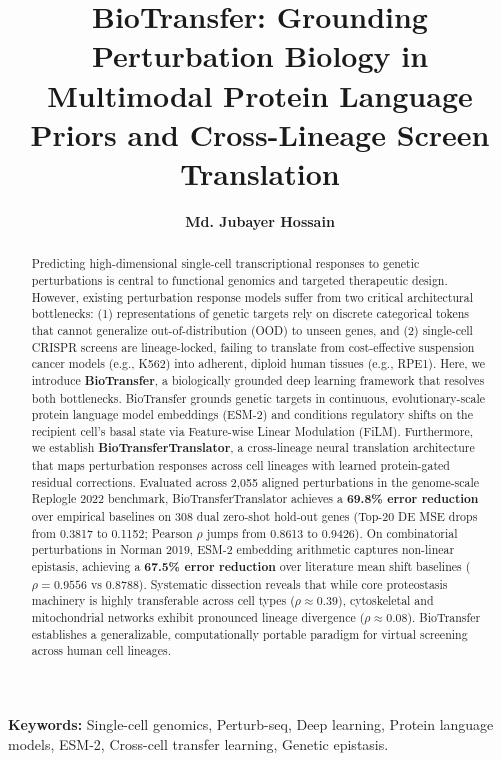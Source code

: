 \documentclass[11pt,letterpaper]{article}
\title{\textbf{\LARGE BioTransfer: Grounding Perturbation Biology in Multimodal Protein Language Priors and Cross-Lineage Screen Translation}}
\author[1,2,*]{\textbf{Md. Jubayer Hossain}}
\affil[1]{\small Center for Health Innovation, Research, Action, and Learning - Bangladesh}
\affil[2]{\small DeepBio}
\affil[*]{\small Corresponding author: \texttt{hossainmj.me@gmail.com}}
\date{}
\begin{document}
\maketitle

\begin{abstract}
\noindent Predicting high-dimensional single-cell transcriptional responses to genetic perturbations is central to functional genomics and targeted therapeutic design. However, existing perturbation response models suffer from two critical architectural bottlenecks: (1) representations of genetic targets rely on discrete categorical tokens that cannot generalize out-of-distribution (OOD) to unseen genes, and (2) single-cell CRISPR screens are lineage-locked, failing to translate from cost-effective suspension cancer models (e.g., K562) into adherent, diploid human tissues (e.g., RPE1). Here, we introduce \textbf{BioTransfer}, a biologically grounded deep learning framework that resolves both bottlenecks. BioTransfer grounds genetic targets in continuous, evolutionary-scale protein language model embeddings (ESM-2) and conditions regulatory shifts on the recipient cell's basal state via Feature-wise Linear Modulation (FiLM). Furthermore, we establish \textbf{BioTransferTranslator}, a cross-lineage neural translation architecture that maps perturbation responses across cell lineages with learned protein-gated residual corrections. Evaluated across 2,055 aligned perturbations in the genome-scale Replogle 2022 benchmark, BioTransferTranslator achieves a \textbf{69.8\% error reduction} over empirical baselines on 308 dual zero-shot hold-out genes (Top-20 DE MSE drops from 0.3817 to 0.1152; Pearson $\rho$ jumps from 0.8613 to 0.9426). On combinatorial perturbations in Norman 2019, ESM-2 embedding arithmetic captures non-linear epistasis, achieving a \textbf{67.5\% error reduction} over literature mean shift baselines ($\rho = 0.9556$ vs $0.8788$). Systematic dissection reveals that while core proteostasis machinery is highly transferable across cell types ($\rho \approx 0.39$), cytoskeletal and mitochondrial networks exhibit pronounced lineage divergence ($\rho \approx 0.08$). BioTransfer establishes a generalizable, computationally portable paradigm for virtual screening across human cell lineages.
\end{abstract}

\vspace{0.8em}
\noindent \textbf{Keywords:} Single-cell genomics, Perturb-seq, Deep learning, Protein language models, ESM-2, Cross-cell transfer learning, Genetic epistasis.
\end{document}

